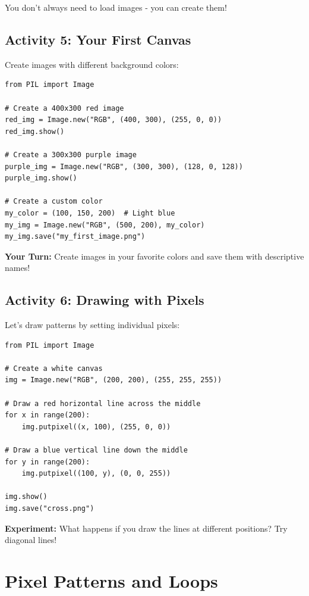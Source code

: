 \documentclass[11pt]{article}
\begin{document}
You don't always need to load images - you can create them!

\subsection*{Activity 5: Your First Canvas}

Create images with different background colors:

\begin{lstlisting}
from PIL import Image

# Create a 400x300 red image
red_img = Image.new("RGB", (400, 300), (255, 0, 0))
red_img.show()

# Create a 300x300 purple image
purple_img = Image.new("RGB", (300, 300), (128, 0, 128))
purple_img.show()

# Create a custom color
my_color = (100, 150, 200)  # Light blue
my_img = Image.new("RGB", (500, 200), my_color)
my_img.save("my_first_image.png")
\end{lstlisting}

\textbf{Your Turn:} Create images in your favorite colors and save them with descriptive names!

\subsection*{Activity 6: Drawing with Pixels}

Let's draw patterns by setting individual pixels:

\begin{lstlisting}
from PIL import Image

# Create a white canvas
img = Image.new("RGB", (200, 200), (255, 255, 255))

# Draw a red horizontal line across the middle
for x in range(200):
    img.putpixel((x, 100), (255, 0, 0))

# Draw a blue vertical line down the middle
for y in range(200):
    img.putpixel((100, y), (0, 0, 255))

img.show()
img.save("cross.png")
\end{lstlisting}

\textbf{Experiment:} What happens if you draw the lines at different positions? Try diagonal lines!

\section{Pixel Patterns and Loops}
\end{document}
